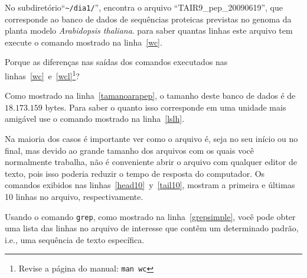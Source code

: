 \documentclass[letter,11pt]{book}
\begin{document}
No subdiretório``\Verb+~/dia1/+'', encontra o arquivo ``TAIR9\_pep\_20090619'', que corresponde ao banco de dados de sequências proteicas previstas no genoma da planta modelo \textit{Arabidopsis thaliana}. para saber quantas linhas este arquivo tem execute o comando mostrado na linha~\ref{wc}.

Porque as diferenças nas saídas dos comandos executados nas linhas~\ref{wc}~e~\ref{wcl}\footnote{Revise a página do manual: \Verb+man wc+}?

Como mostrado na linha~\ref{tamanoarapep}, o tamanho deste banco de dados é de $18.173.159$ bytes. Para saber o quanto isso corresponde em uma unidade mais amigável use o comando mostrado na linha~\ref{lslh}.

Na maioria dos casos é importante ver como o arquivo é, seja no seu início ou no final, mas devido ao grande tamanho dos arquivos com os quais você normalmente trabalha, não é conveniente abrir o arquivo com qualquer editor de texto, pois isso poderia reduzir o tempo de resposta do computador. Os comandos exibidos nas linhas~\ref{head10}~y~\ref{tail10}, mostram a primeira e últimas 10 linhas no arquivo, respectivamente.

Usando o comando \Verb+grep+, como mostrado na linha~\ref{grepsimple}, você pode obter uma lista das linhas no arquivo de interesse que contêm um determinado padrão, i.e., uma sequência de texto específica.
\end{document}

